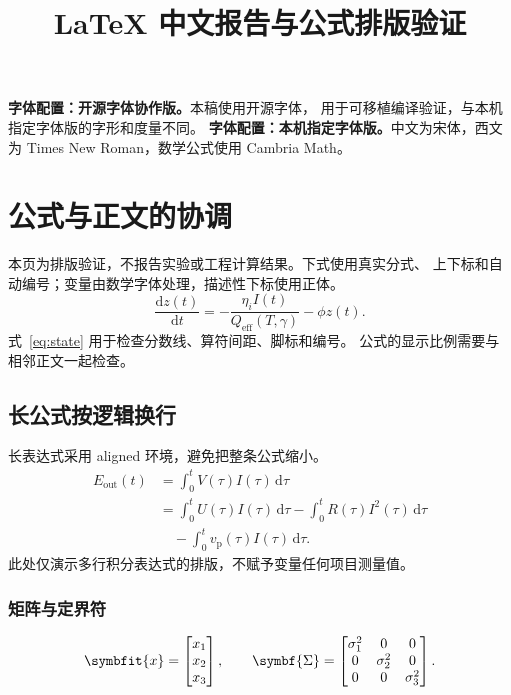 \documentclass[UTF8,fontset=none,zihao=5]{ctexart}
\title{\sffamily\bfseries LaTeX 中文报告与公式排版验证}
\author{}
\date{}
\begin{document}
\pagestyle{plain}
\maketitle
\ifportablefonts
\noindent\textbf{字体配置：开源字体协作版。}本稿使用开源字体，
用于可移植编译验证，与本机指定字体版的字形和度量不同。
\else
\noindent\textbf{字体配置：本机指定字体版。}中文为宋体，西文为
Times New Roman，数学公式使用 Cambria Math。
\fi

\section{公式与正文的协调}
本页为排版验证，不报告实验或工程计算结果。下式使用真实分式、
上下标和自动编号；变量由数学字体处理，描述性下标使用正体。
\begin{equation}
 \frac{\mathrm{d}z(t)}{\mathrm{d}t}
 =-\frac{\eta_i I(t)}{Q_{\mathrm{eff}}(T,\gamma)}-\phi z(t).
 \label{eq:state}
\end{equation}
式~\eqref{eq:state} 用于检查分数线、算符间距、脚标和编号。
公式的显示比例需要与相邻正文一起检查。

\subsection{长公式按逻辑换行}
长表达式采用 aligned 环境，避免把整条公式缩小。
\begin{equation}
 \begin{aligned}
 E_{\mathrm{out}}(t)
 &=\int_0^t V(\tau)I(\tau)\,\mathrm{d}\tau\\
 &=\int_0^t U(\tau)I(\tau)\,\mathrm{d}\tau
   -\int_0^t R(\tau)I^2(\tau)\,\mathrm{d}\tau\\
 &\quad-\int_0^t v_{\mathrm{p}}(\tau)I(\tau)\,\mathrm{d}\tau .
 \end{aligned}
 \label{eq:integral}
\end{equation}
此处仅演示多行积分表达式的排版，不赋予变量任何项目测量值。

\subsubsection{矩阵与定界符}
\begin{equation}
 \symbfit{x}=
 \begin{bmatrix}x_1\\x_2\\x_3\end{bmatrix},
 \qquad
 \symbf{\Sigma}=
 \begin{bmatrix}
 \sigma_1^2 & 0 & 0\\
 0 & \sigma_2^2 & 0\\
 0 & 0 & \sigma_3^2
 \end{bmatrix}.
\end{equation}
\end{document}
